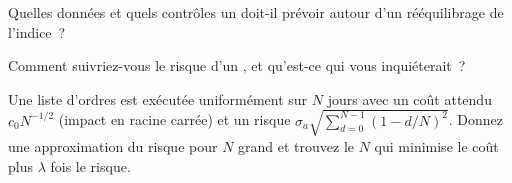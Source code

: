\begin{interviewq}\label{iq:s1:the-asset-managers-strategies:4}
Quelles données et quels contrôles un  doit-il prévoir autour d'un rééquilibrage de l'indice~?
\end{interviewq}

\begin{interviewq}\label{iq:s1:the-asset-managers-strategies:5}
Comment suivriez-vous le risque d'un , et qu'est-ce qui vous inquiéterait~?
\end{interviewq}

\begin{interviewq}\label{iq:s1:the-asset-managers-strategies:6}
Une liste d'ordres est exécutée uniformément sur $N$ jours avec un coût attendu $c_0 N^{-1/2}$ (impact en racine carrée) et un risque $\sigma_a \sqrt{\sum_{d=0}^{N-1}(1 -
d/N)^2}$. Donnez une approximation du risque pour $N$ grand et trouvez le $N$ qui minimise le coût plus $\lambda$ fois le risque.
\end{interviewq}
